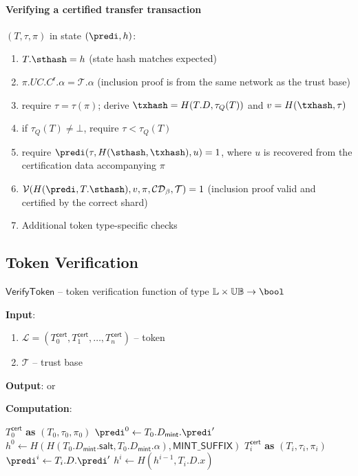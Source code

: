 \paragraph{Verifying a certified transfer transaction} $(T, \tau, \pi)$ in state $(\predi, h)$:
\begin{enumerate}
	\item $T.\sthash = h$ \quad (state hash matches expected)
	\item $\pi.UC.C^\mathsf{r}.\alpha = \mathcal{T}.\alpha$ \quad (inclusion proof is from the same network as the trust base)
	\item require $\tau=\tau(\pi)$; derive $\txhash=H(T.D,\tau_Q(T))$ and $v=H(\txhash,\tau)$
	\item if $\tau_Q(T)\ne\bot$, require $\tau < \tau_Q(T)$
	\item require $\predi(\tau, H(\sthash, \txhash), u) = 1$, where $u$ is recovered from the certification data accompanying $\pi$
	\item $\mathcal{V}(H(\predi, T.\sthash), v, \pi, \mathcal{CD}_\beta, \mathcal{T}) = 1$ \quad (inclusion proof valid and certified by the correct shard)
	\item Additional token type-specific checks
\end{enumerate}

\subsection{Token Verification}\label{sec:token-verification}

$\mathsf{VerifyToken}$ -- token verification function of type $\mathbb{L} \times \mathbb{UB} \to \bool$

\textbf{Input}:
\begin{enumerate}
	\item $\mathcal{L} = (T_0^\mathsf{cert}, T_1^\mathsf{cert}, \ldots, T_n^\mathsf{cert})$ -- token
	\item $\mathcal{T}$ -- trust base
\end{enumerate}

\textbf{Output}: \TRUE or \FALSE

\textbf{Computation}:
\begin{algorithmic}[0]
	\State \Parse $T_0^\mathsf{cert}$ \textbf{as} $(T_0, \tau_0, \pi_0)$
	 \Return \FALSE \EndIf
	 \Return \FALSE \EndIf
	\State $\predi^0 \gets T_0.D_\mathsf{mint}.\predi'$
	\State $h^0 \gets H(H(T_0.D_\mathsf{mint}.\mathsf{salt}, T_0.D_\mathsf{mint}.\alpha), \mathsf{MINT\_SUFFIX})$
		\State \Parse $T_i^\mathsf{cert}$ \textbf{as} $(T_i, \tau_i, \pi_i)$
		 \Return \FALSE \EndIf
		\State $\predi^{i} \gets T_i.D.\predi'$
		\State $h^{i} \gets H(h^{i-1}, T_i.D.x)$
	\EndFor
	\State \Return \TRUE
\end{algorithmic}

